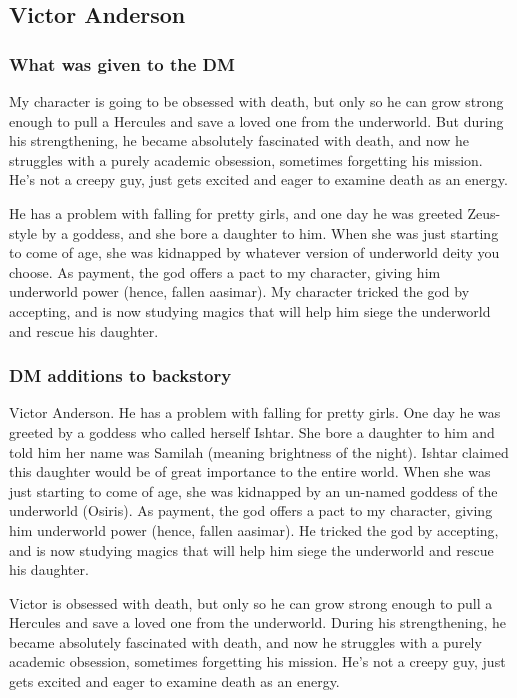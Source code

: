 \subsection{Victor Anderson}

\subsubsection{What was given to the DM}

My character is going to be obsessed with death, but only so he can grow strong enough to pull a Hercules and save a loved one from the underworld. But during his strengthening, he became absolutely fascinated with death, and now he struggles with a purely academic obsession, sometimes forgetting his mission. He's not a creepy guy, just gets excited and eager to examine death as an energy.

He has a problem with falling for pretty girls, and one day he was greeted Zeus-style by a goddess, and she bore a daughter to him. When she was just starting to come of age, she was kidnapped by whatever version of underworld deity you choose. As payment, the god offers a pact to my character, giving him underworld power (hence, fallen aasimar). My character tricked the god by accepting, and is now studying magics that will help him siege the underworld and rescue his daughter.

\subsubsection{DM additions to backstory}

Victor Anderson. He has a problem with falling for pretty girls. One day he was greeted by a goddess who called herself Ishtar. She bore a daughter to him and told him her name was Samilah (meaning brightness of the night). Ishtar claimed this daughter would be of great importance to the entire world. When she was just starting to come of age, she was kidnapped by an un-named goddess of the underworld (Osiris). As payment, the god offers a pact to my character, giving him underworld power (hence, fallen aasimar). He tricked the god by accepting, and is now studying magics that will help him siege the underworld and rescue his daughter.

Victor is obsessed with death, but only so he can grow strong enough to pull a Hercules and save a loved one from the underworld. During his strengthening, he became absolutely fascinated with death, and now he struggles with a purely academic obsession, sometimes forgetting his mission. He's not a creepy guy, just gets excited and eager to examine death as an energy.

